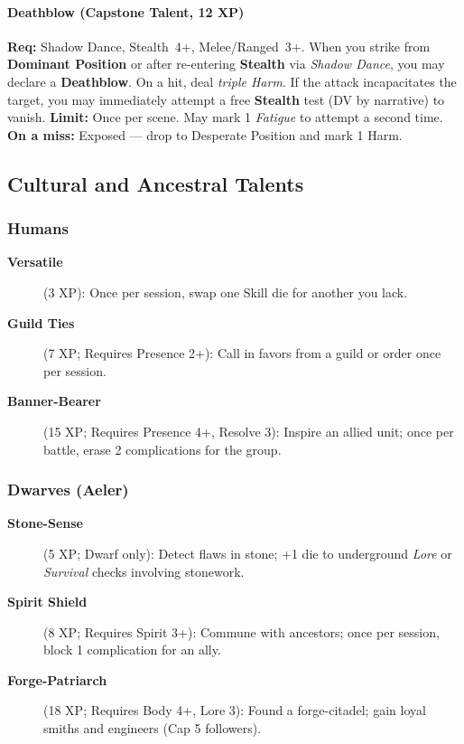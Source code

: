 \paragraph{Deathblow (Capstone Talent, 12 XP)}  
\textbf{Req:} Shadow Dance, Stealth~4+, Melee/Ranged~3+.  
When you strike from \textbf{Dominant Position} or after re-entering \textbf{Stealth} via \emph{Shadow Dance}, you may declare a \textbf{Deathblow}.  
On a hit, deal \emph{triple Harm}. If the attack incapacitates the target, you may immediately attempt a free \textbf{Stealth} test (DV by narrative) to vanish.  
\textbf{Limit:} Once per scene. May mark 1 \emph{Fatigue} to attempt a second time.  
\textbf{On a miss:} Exposed --- drop to Desperate Position and mark 1 Harm.  

\subsection{Cultural and Ancestral Talents}
\label{subsec:cultural-talents}

\subsubsection{Humans}
\label{subsubsec:human-talents}

\begin{description}
\item[\textbf{Versatile}] (3 XP): Once per session, swap one Skill die for another you lack.
\item[\textbf{Guild Ties}] (7 XP; Requires Presence 2+): Call in favors from a guild or order once per session.
\item[\textbf{Banner-Bearer}] (15 XP; Requires Presence 4+, Resolve 3): Inspire an allied unit; once per battle, erase 2 complications for the group.
\end{description}

\subsubsection{Dwarves (Aeler)}
\label{subsubsec:dwarf-talents}

\begin{description}
\item[\textbf{Stone-Sense}] (5 XP; Dwarf only): Detect flaws in stone; +1 die to underground \emph{Lore} or \emph{Survival} checks involving stonework.
\item[\textbf{Spirit Shield}] (8 XP; Requires Spirit 3+): Commune with ancestors; once per session, block 1 complication for an ally.
\item[\textbf{Forge-Patriarch}] (18 XP; Requires Body 4+, Lore 3): Found a forge-citadel; gain loyal smiths and engineers (Cap 5 followers).
\end{description}

